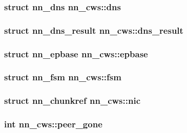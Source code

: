 \subsubsection[{dns}]{\setlength{\rightskip}{0pt plus 5cm}struct {\bf nn\+\_\+dns} nn\+\_\+cws\+::dns}\hypertarget{structnn__cws_aa6087b33d2a780cb5b5d7f56e1819d60}{}\label{structnn__cws_aa6087b33d2a780cb5b5d7f56e1819d60}
\subsubsection[{dns\+\_\+result}]{\setlength{\rightskip}{0pt plus 5cm}struct {\bf nn\+\_\+dns\+\_\+result} nn\+\_\+cws\+::dns\+\_\+result}\hypertarget{structnn__cws_a08c7413b29dea92196ccfa67753cb471}{}\label{structnn__cws_a08c7413b29dea92196ccfa67753cb471}
\subsubsection[{epbase}]{\setlength{\rightskip}{0pt plus 5cm}struct {\bf nn\+\_\+epbase} nn\+\_\+cws\+::epbase}\hypertarget{structnn__cws_a6826c5e288398b8ce02bbd50fad890f6}{}\label{structnn__cws_a6826c5e288398b8ce02bbd50fad890f6}
\subsubsection[{fsm}]{\setlength{\rightskip}{0pt plus 5cm}struct {\bf nn\+\_\+fsm} nn\+\_\+cws\+::fsm}\hypertarget{structnn__cws_a41c2cbb214b831321536bac975a001d1}{}\label{structnn__cws_a41c2cbb214b831321536bac975a001d1}
\subsubsection[{nic}]{\setlength{\rightskip}{0pt plus 5cm}struct {\bf nn\+\_\+chunkref} nn\+\_\+cws\+::nic}\hypertarget{structnn__cws_ae43be2ce7b2083ca18e84472b0e67628}{}\label{structnn__cws_ae43be2ce7b2083ca18e84472b0e67628}
\subsubsection[{peer\+\_\+gone}]{\setlength{\rightskip}{0pt plus 5cm}int nn\+\_\+cws\+::peer\+\_\+gone}\hypertarget{structnn__cws_a953699c3a7fc6c8addf3379489a0efbd}{}\label{structnn__cws_a953699c3a7fc6c8addf3379489a0efbd}
